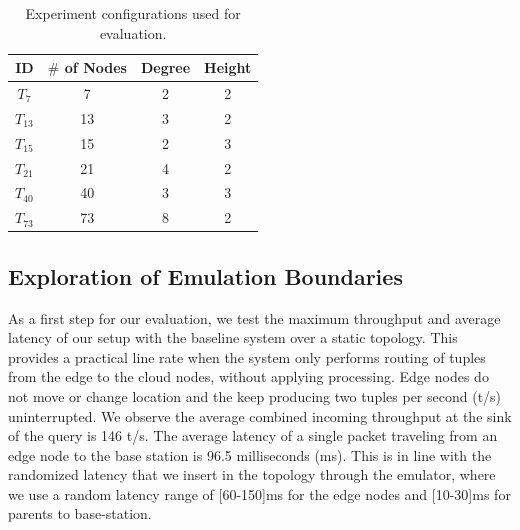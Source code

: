 \begin{table}[t]
  \centering
  \caption{Experiment configurations used for evaluation.}
  \vspace{-3mm}
  \begin{tabular}{| c | c | c | c |}
    \hline
    \textbf{ID} & \textbf{$\#$ of Nodes} & \textbf{Degree} & \textbf{Height} \\
    \hline
    $T_{7}$ & 7 & 2 & 2 \\
    \hline
    $T_{13}$ & 13 & 3 & 2 \\
    \hline
    $T_{15}$ & 15 & 2 & 3 \\
    \hline
    $T_{21}$ & 21 & 4 & 2 \\
    \hline
    $T_{40}$ & 40 & 3 & 3 \\
    \hline    
    $T_{73}$ & 73 & 8 & 2 \\
    \hline    
  \end{tabular}
\label{tab:experiment-configuration}
\end{table}

\subsection{Exploration of Emulation Boundaries}
\label{sec:evaluation-line-rate}
As a first step for our evaluation, we test the maximum throughput and average latency of our setup with the baseline system over a static topology. This provides a practical line rate when the system only performs routing of tuples from the edge to the cloud nodes, without applying processing. Edge nodes do not move or change location and the keep producing two tuples per second (t/s) uninterrupted.  
We observe the average combined incoming 
throughput at the sink of the query is 146 t/s. 
The average latency of a single packet traveling from an edge node
to the base station is 96.5 milliseconds (ms). This is in line with the randomized latency that
we insert in the topology through the emulator, where we use a random latency range of [60-150]ms for the edge nodes and [10-30]ms for parents to base-station.

